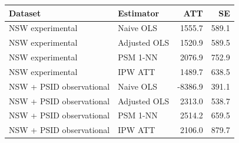 \begin{tabular}{llrr}
    \toprule
    Dataset & Estimator & ATT & SE \\
    \midrule
    NSW experimental & Naive OLS & 1555.7 & 589.1 \\
    NSW experimental & Adjusted OLS & 1520.9 & 589.5 \\
    NSW experimental & PSM 1-NN & 2076.9 & 752.9 \\
    NSW experimental & IPW ATT & 1489.7 & 638.5 \\
    NSW + PSID observational & Naive OLS & -8386.9 & 391.1 \\
    NSW + PSID observational & Adjusted OLS & 2313.0 & 538.7 \\
    NSW + PSID observational & PSM 1-NN & 2514.2 & 659.5 \\
    NSW + PSID observational & IPW ATT & 2106.0 & 879.7 \\
    \bottomrule
\end{tabular}
